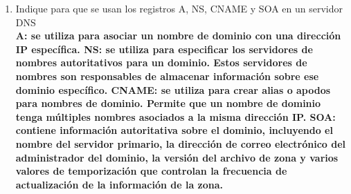 \documentclass[14pt]{book}
\begin{document}
\begin{enumerate}
  \item Indique para que se usan los registros A, NS, CNAME y SOA en un servidor DNS\\
  \textbf{A: se utiliza para asociar un nombre de dominio con una dirección IP específica.
  NS: se utiliza para especificar los servidores de nombres autoritativos para un dominio. Estos servidores de nombres son responsables de almacenar información sobre ese dominio específico.
  CNAME: se utiliza para crear alias o apodos para nombres de dominio. Permite que un nombre de dominio tenga múltiples nombres asociados a la misma dirección IP.
  SOA: contiene información autoritativa sobre el dominio, incluyendo el nombre del servidor primario, la dirección de correo electrónico del administrador del dominio, la versión del archivo de zona y varios valores de temporización que controlan la frecuencia de actualización de la información de la zona.}
\end{enumerate}
\end{document}

